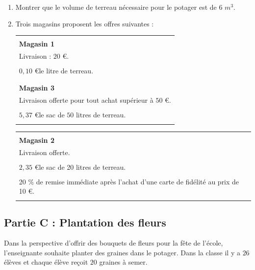 \begin{enumerate}
    \item Montrer que le volume de terreau nécessaire pour le potager est de $6$ $m^3$.
    \item Trois magasins proposent les offres suivantes :
    
    \noindent\begin{tabularx}{0.55\linewidth}{|X|}
        \hline
        \\
        {\centering \textbf{Magasin 1}\\}\\
        Livraison : $20$ \euro.\\
        \\
        $0,10$ \euro le litre de terreau.\\
        \\
        \hline         
        \hline
        \\
        {\centering \textbf{Magasin 3}\\}\\
        Livraison offerte pour tout achat supérieur à $50$ \euro.\\
        \\
        $5,37$ \euro le sac de $50$ litres de terreau.\\
        \\
        \hline 
    \end{tabularx}
    \noindent\begin{tabularx}{0.4\linewidth}{|X|}
        \hline
        \\
        {\centering \textbf{Magasin 2}\\}\\
        Livraison offerte.\\
        \\
        $2,35$ \euro le sac de 20 litres de terreau.\\
        \\
        20 \% de remise immédiate après l'achat d’une carte de fidélité au prix de 10 \euro.\\
        \\
        \hline         
    \end{tabularx}
\end{enumerate}

\subsection*{Partie C : Plantation des fleurs}
Dans la perspective d'offrir des bouquets de fleurs pour la fête de l'école, l'enseignante
souhaite planter des graines dans le potager. Dans la classe il y a $26$ élèves et chaque élève
re\c coit $20$ graines à semer.

